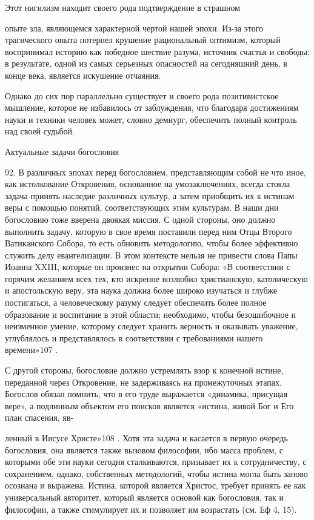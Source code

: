 \documentclass[a5paper,10pt]{article}
\begin{document}
Этот нигилизм находит своего рода подтверждение в страшном

опыте зла, являющемся характерной чертой нашей эпохи. Из-за этого трагического
опыта потерпел крушение рациональный оптимизм, который воспринимал историю как
победное шествие разума, источник счастья и свободы; в результате, одной из
самых серьезных опасностей на сегодняшний день, в конце века, является
искушение отчаяния.

Однако до сих пор параллельно существует и своего рода позитивистское мышление,
которое не избавилось от заблуждения, что благодаря достижениям науки и техники
человек может, словно демиург, обеспечить полный контроль над своей судьбой.

Актуальные задачи богословия

92. В различных эпохах перед богословием, представляющим собой не что иное, как
истолкование Откровения, основанное на умозаключениях, всегда стояла задача
принять наследие различных культур, а затем приобщить их к истинам веры с
помощью понятий, соответствующих этим культурам. В наши дни богословию тоже
вверена двоякая миссия. С одной стороны, оно должно выполнить задачу, которую в
свое время поставили перед ним Отцы Второго Ватиканского Собора, то есть
обновить методологию, чтобы более эффективно служить делу евангелизации. В этом
контексте нельзя не привести слова Папы Иоанна XXIII, которые он произнес на
открытии Собора: «В соответствии с горячим желанием всех тех, кто искренне
возлюбил христианскую, католическую и апостольскую веру, эта наука должна более
широко изучаться и глубже постигаться, а человеческому разуму следует
обеспечить более полное образование и воспитание в этой области; необходимо,
чтобы безошибочное и неизменное умение, которому следует хранить верность и
оказывать уважение, углублялось и представлялось в соответствии с требованиями
нашего времени»107 .

С другой стороны, богословие должно устремлять взор к конечной истине,
переданной через Откровение, не задерживаясь на промежуточных этапах. Богослов
обязан помнить, что в его труде выражается «динамика, присущая вере», а
подлинным объектом его поисков является «истина, живой Бог и Его план спасения,
яв-

ленный в Иисусе Христе»108 . Хотя эта задача и касается в первую очередь
богословия, она является также вызовом философии, ибо масса проблем, с которыми
обе эти науки сегодня сталкиваются, призывает их к сотрудничеству, с
сохранением, однако, собственных методологий, чтобы истина могла быть заново
осознана и выражена. Истина, которой является Христос, требует принять ее как
универсальный авторитет, который является основой как богословия, так и
философии, а также стимулирует их и позволяет им возрастать (см. Еф 4, 15).
\end{document}
